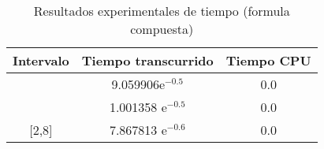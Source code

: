\begin{table}[!ht]
\begin{center}
\begin{tabular}{|c||c||c|} \hline 
\textbf{Intervalo} & \textbf{Tiempo transcurrido}  & \textbf{Tiempo CPU}\\ \hline \hline
[-1,1] &  9.059906$\text{e}^{-0.5}$ & 0.0
\\
\hline
[-1,4] & 1.001358 $\text{e}^{-0.5}$& 0.0
\\
\hline

[2,8] & 7.867813 $\text{e}^{-0.6}$& 0.0
\\
\hline
\hline

\end{tabular}
\end{center}
\caption{Resultados experimentales de tiempo (formula compuesta)}
\label{tab:2}
\end{table}
